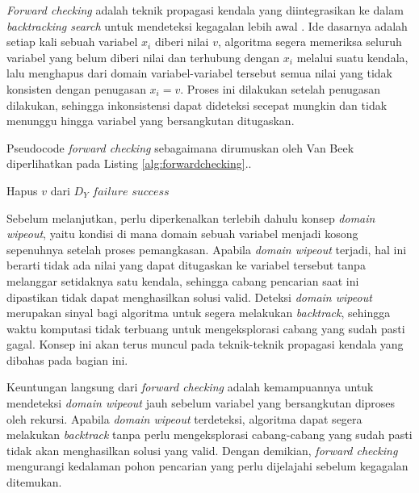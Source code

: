 \textit{Forward checking} adalah teknik propagasi kendala yang diintegrasikan ke dalam \textit{backtracking search} untuk mendeteksi kegagalan lebih awal \cite{van2006backtracking}. Ide dasarnya adalah setiap kali sebuah variabel $x_i$ diberi nilai $v$, algoritma segera memeriksa seluruh variabel yang belum diberi nilai dan terhubung dengan $x_i$ melalui suatu kendala, lalu menghapus dari domain variabel-variabel tersebut semua nilai yang tidak konsisten dengan penugasan $x_i = v$. Proses ini dilakukan setelah penugasan dilakukan, sehingga inkonsistensi dapat dideteksi secepat mungkin dan tidak menunggu hingga variabel yang bersangkutan ditugaskan.

Pseudocode \textit{forward checking} sebagaimana dirumuskan oleh Van Beek \cite{van2006backtracking} diperlihatkan pada Listing \ref{alg:forwardchecking}..

\begin{algorithm}[H]
	\caption{Forward Checking}
	\label{alg:forwardchecking}
	\begin{algorithmic}[1]
		\State Hapus $v$ dari $D_Y$
		\EndIf
		\EndFor
		\State \Return $failure$
		\EndIf
		\EndFor
		\State \Return $success$
		\EndFunction
	\end{algorithmic}
\end{algorithm}

Sebelum melanjutkan, perlu diperkenalkan terlebih dahulu konsep \textit{domain wipeout}, yaitu kondisi di mana domain sebuah variabel menjadi kosong sepenuhnya setelah proses pemangkasan. Apabila \textit{domain wipeout} terjadi, hal ini berarti tidak ada nilai yang dapat ditugaskan ke variabel tersebut tanpa melanggar setidaknya satu kendala, sehingga cabang pencarian saat ini dipastikan tidak dapat menghasilkan solusi valid. Deteksi \textit{domain wipeout} merupakan sinyal bagi algoritma untuk segera melakukan \textit{backtrack}, sehingga waktu komputasi tidak terbuang untuk mengeksplorasi cabang yang sudah pasti gagal. Konsep ini akan terus muncul pada teknik-teknik propagasi kendala yang dibahas pada bagian ini.

Keuntungan langsung dari \textit{forward checking} adalah kemampuannya untuk mendeteksi \textit{domain wipeout} jauh sebelum variabel yang bersangkutan diproses oleh rekursi. Apabila \textit{domain wipeout} terdeteksi, algoritma dapat segera melakukan \textit{backtrack} tanpa perlu mengeksplorasi cabang-cabang yang sudah pasti tidak akan menghasilkan solusi yang valid. Dengan demikian, \textit{forward checking} mengurangi kedalaman pohon pencarian yang perlu dijelajahi sebelum kegagalan ditemukan.

